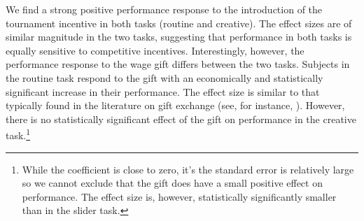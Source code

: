 We find a strong positive performance response to the introduction of the tournament incentive
in both tasks
(routine and creative). The effect sizes are of similar magnitude in the two tasks, 
suggesting  that  performance in  both tasks is equally sensitive to competitive incentives.
Interestingly, however, the performance response to the wage gift
 differs between the two tasks. Subjects in the routine task
respond to the gift with an economically and statistically significant
increase in their performance. The effect size is similar to that typically found in the
literature on gift exchange (see, for instance, \citealp{Fehr02WP}).
However, there is no statistically significant effect of the gift on performance in the creative task.\footnote{While the coefficient is close to zero, it's the standard error is relatively large so we cannot exclude that the gift does have a small positive effect on performance. The effect size is, however, statistically significantly smaller than in the slider task. }



